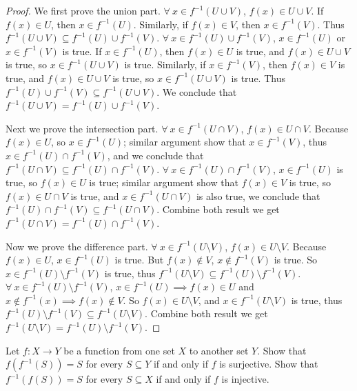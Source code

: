 \begin{proof}
We first prove the union part.
\(\forall\ x \in f^{-1}(U \cup V)\), \(f(x) \in U \cup V\).
If \(f(x) \in U\), then \(x \in f^{-1}(U)\).
Similarly, if \(f(x) \in V\), then \(x \in f^{-1}(V)\).
Thus \(f^{-1}(U \cup V) \subseteq f^{-1}(U) \cup f^{-1}(V)\).
\(\forall\ x \in f^{-1}(U) \cup f^{-1}(V)\), \(x \in f^{-1}(U)\) or \(x \in f^{-1}(V)\) is true.
If \(x \in f^{-1}(U)\), then \(f(x) \in U\) is true, and \(f(x) \in U \cup V\) is true, so \(x \in f^{-1}(U \cup V)\) is true.
Similarly, if \(x \in f^{-1}(V)\), then \(f(x) \in V\) is true, and \(f(x) \in U \cup V\) is true, so \(x \in f^{-1}(U \cup V)\) is true.
Thus \(f^{-1}(U) \cup f^{-1}(V) \subseteq f^{-1}(U \cup V)\).
We conclude that \(f^{-1}(U \cup V) = f^{-1}(U) \cup f^{-1}(V)\).

Next we prove the intersection part.
\(\forall\ x \in f^{-1}(U \cap V)\), \(f(x) \in U \cap V\).
Because \(f(x) \in U\), so \(x \in f^{-1}(U)\);
similar argument show that \(x \in f^{-1}(V)\), thus \(x \in f^{-1}(U) \cap f^{-1}(V)\), and we conclude that \(f^{-1}(U \cap V) \subseteq f^{-1}(U) \cap f^{-1}(V)\).
\(\forall\ x \in f^{-1}(U) \cap f^{-1}(V)\), \(x \in f^{-1}(U)\) is true, so \(f(x) \in U\) is true;
similar argument show that \(f(x) \in V\) is true, so \(f(x) \in U \cap V\) is true, and \(x \in f^{-1}(U \cap V)\) is also true, we conclude that \(f^{-1}(U) \cap f^{-1}(V) \subseteq f^{-1}(U \cap V)\).
Combine both result we get \(f^{-1}(U \cap V) = f^{-1}(U) \cap f^{-1}(V)\).

Now we prove the difference part.
\(\forall\ x \in f^{-1}(U \setminus V)\), \(f(x) \in U \setminus V\).
Because \(f(x) \in U\), \(x \in f^{-1}(U)\) is true.
But \(f(x) \notin V\), \(x \notin f^{-1}(V)\) is true.
So \(x \in f^{-1}(U) \setminus f^{-1}(V)\) is true, thus \(f^{-1}(U \setminus V) \subseteq f^{-1}(U) \setminus f^{-1}(V)\).
\(\forall\ x \in f^{-1}(U) \setminus f^{-1}(V)\), \(x \in f^{-1}(U) \implies f(x) \in U\) and \(x \notin f^{-1}(x) \implies f(x) \notin V\).
So \(f(x) \in U \setminus V\), and \(x \in f^{-1}(U \setminus V)\) is true, thus \( f^{-1}(U) \setminus f^{-1}(V) \subseteq f^{-1}(U \setminus V)\).
Combine both result we get \(f^{-1}(U \setminus V) = f^{-1}(U) \setminus f^{-1}(V)\).
\end{proof}

\begin{exercise}\label{ex 3.4.5}
Let \(f : X \to Y\) be a function from one set \(X\) to another set \(Y\).
Show that \(f(f^{-1}(S)) = S\) for every \(S \subseteq Y\) if and only if \(f\) is surjective.
Show that \(f^{-1}(f(S)) = S\) for every \(S \subseteq X\) if and only if \(f\) is injective.
\end{exercise}

